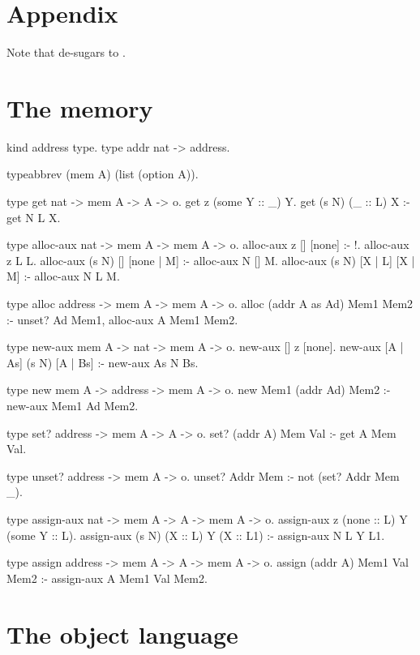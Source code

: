 \section*{Appendix}

Note that  de-sugars to .

\section{The memory}

\begin{elpicode}
  kind address type.
  type addr nat -> address.

  typeabbrev (mem A) (list (option A)).

  type get nat -> mem A -> A -> o.
  get z (some Y :: _) Y.
  get (s N) (_ :: L) X :- get N L X.

  type alloc-aux nat -> mem A -> mem A -> o.
  alloc-aux z [] [none] :- !.
  alloc-aux z L L.
  alloc-aux (s N) [] [none | M] :- alloc-aux N [] M.
  alloc-aux (s N) [X | L] [X | M] :- alloc-aux N L M.

  type alloc address -> mem A -> mem A -> o.
  alloc (addr A as Ad) Mem1 Mem2 :- unset? Ad Mem1, 
    alloc-aux A Mem1 Mem2.

  type new-aux mem A -> nat -> mem A -> o.
  new-aux [] z [none].
  new-aux [A | As] (s N) [A | Bs] :- new-aux As N Bs.

  type new mem A -> address -> mem A -> o.
  new Mem1 (addr Ad) Mem2 :- new-aux Mem1 Ad Mem2.

  type set? address -> mem A -> A -> o.
  set? (addr A) Mem Val :- get A Mem Val.

  type unset? address -> mem A -> o.
  unset? Addr Mem :- not (set? Addr Mem _).

  type assign-aux nat -> mem A -> A -> mem A -> o.
  assign-aux z (none :: L) Y (some Y :: L).
  assign-aux (s N) (X :: L) Y (X :: L1) :- assign-aux N L Y L1.

  type assign address -> mem A -> A -> mem A -> o.
  assign (addr A) Mem1 Val Mem2 :- assign-aux A Mem1 Val Mem2.
\end{elpicode}

\section{The object language}

